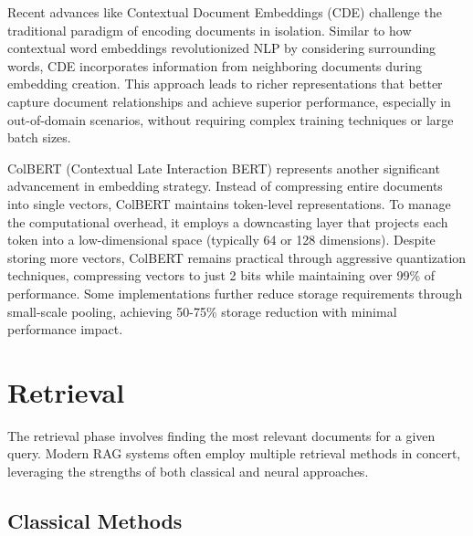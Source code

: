 \documentclass[notoc, tikz]{tufte-handout}
\begin{document}
Recent advances like Contextual Document Embeddings \citep{morris2024contextual} (CDE) challenge the traditional paradigm of encoding documents in isolation. Similar to how contextual word embeddings revolutionized NLP by considering surrounding words, CDE incorporates information from neighboring documents during embedding creation. This approach leads to richer representations that better capture document relationships and achieve superior performance, especially in out-of-domain scenarios, without requiring complex training techniques or large batch sizes.

ColBERT \citep{colbert} (Contextual Late Interaction BERT) represents another significant advancement in embedding strategy. Instead of compressing entire documents into single vectors, ColBERT maintains token-level representations. To manage the computational overhead, it employs a downcasting layer that projects each token into a low-dimensional space (typically 64 or 128 dimensions). Despite storing more vectors, ColBERT remains practical through aggressive quantization techniques, compressing vectors to just 2 bits while maintaining over 99\% of performance. Some implementations further reduce storage requirements through small-scale pooling, achieving 50-75\% storage reduction with minimal performance impact.

\section{Retrieval}

The retrieval phase involves finding the most relevant documents for a given query. Modern RAG systems often employ multiple retrieval methods in concert, leveraging the strengths of both classical and neural approaches.

\subsection{Classical Methods}
\end{document}
